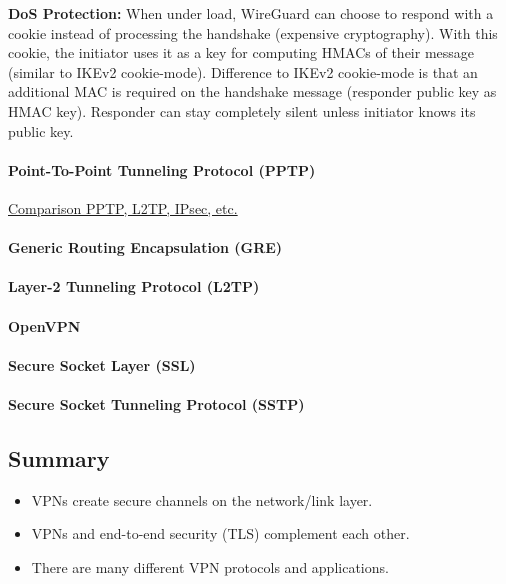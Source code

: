 \textbf{DoS Protection:} When under load, WireGuard can choose to respond with a cookie instead of processing the handshake (expensive cryptography). With this cookie, the initiator uses it as a key for computing HMACs of their message (similar to IKEv2 cookie-mode). Difference to IKEv2 cookie-mode is that an additional MAC is required on the handshake message (responder public key as HMAC key). Responder can stay completely silent unless initiator knows its public key. %

\paragraph{Point-To-Point Tunneling Protocol (PPTP)}

\href{https://citeseerx.ist.psu.edu/viewdoc/download?doi=10.1.1.503.7298&rep=rep1&type=pdf}{Comparison PPTP, L2TP, IPsec, etc.}

\paragraph{Generic Routing Encapsulation (GRE)}

\paragraph{Layer-2 Tunneling Protocol (L2TP)}

\paragraph{OpenVPN}

\paragraph{Secure Socket Layer (SSL)}

\paragraph{Secure Socket Tunneling Protocol (SSTP)}




\subsection{Summary}

\begin{itemize}
    \item VPNs create secure channels on the network/link layer.
    \item VPNs and end-to-end security (TLS) complement each other.
    \item There are many different VPN protocols and applications.
\end{itemize}